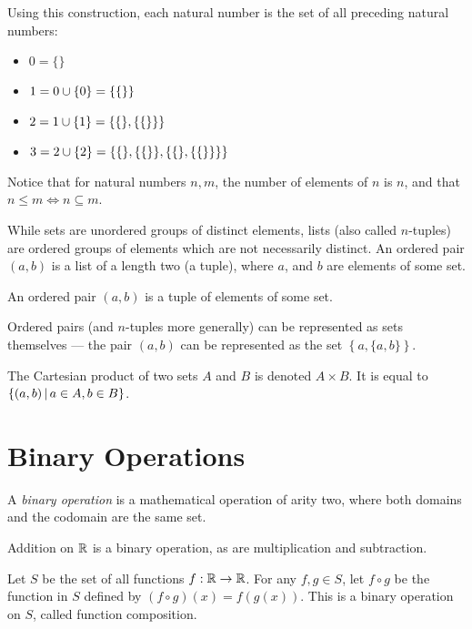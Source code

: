 Using this construction, each natural number is the set of all preceding natural numbers:
\begin{itemize}
    \item $0 = \{\}$
    \item $1 = 0 \cup \{0\} = \{\{\}\}$
    \item $2 = 1 \cup \{1\} = \{\{\}, \{\{\}\}\}$
    \item $3 = 2 \cup \{2\} = \{\{\}, \{\{\}\}, \{\{\}, \{\{\}\}\}\}$
\end{itemize}

Notice that for natural numbers $n, m$, the number of elements of $n$ is $n$, and that $n \leq m \iff n \subseteq m$.

While sets are unordered groups of distinct elements, lists (also called $n$-tuples) are ordered groups of elements which are not necessarily distinct. An ordered pair $(a, b)$ is a list of a length two (a tuple), where $a$, and $b$ are elements of some set.

\begin{defn}\label{tuple}
    An ordered pair $(a, b)$ is a tuple of elements of some set.
\end{defn}

Ordered pairs (and $n$-tuples more generally) can be represented as sets themselves --- the pair $(a, b)$ can be represented as the set $\left\{a, \{a, b\}\right\}$.

\begin{defn}\label{cartesian-product}
    The Cartesian product of two sets $A$ and $B$ is denoted $A \times B$. It is equal to $\left\{\left(a, b\right) \,\middle|\, a \in A, b \in B \right\}$.
\end{defn}

\section{Binary Operations}

\begin{defn}
    A \emph{binary operation} is a mathematical operation of arity two, where both domains and the codomain are the same set.
\end{defn}

\begin{exmp}
    Addition on $\mathbb{R}$ is a binary operation, as are multiplication and subtraction.
\end{exmp}

\begin{exmp}
    Let $S$ be the set of all functions $f : \mathbb{R} \to \mathbb{R}$. For any $f, g \in S$, let $f \circ g$ be the function in $S$ defined by $(f \circ g)(x) = f(g(x))$. This is a binary operation on $S$, called function composition.
\end{exmp}

